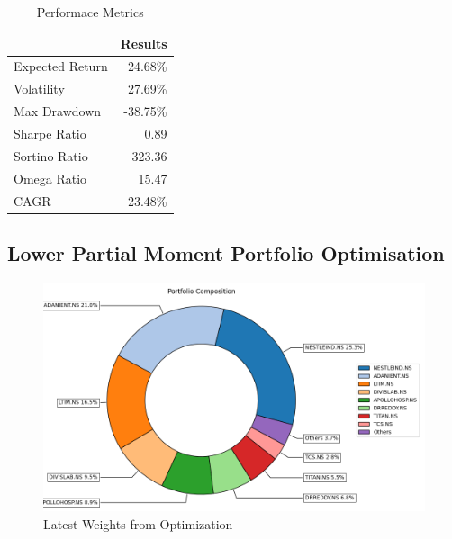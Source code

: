  \begin{table}[H]

    \centering %
    \label{tab:performance_metrics}
    
    \caption{Performace Metrics}
    \vspace{5mm} %

\begin{tabular}{lr}
\toprule
 & Results \\
\midrule
Expected Return & 24.68\% \\
Volatility & 27.69\% \\
Max Drawdown & -38.75\% \\
Sharpe Ratio & 0.89 \\
Sortino Ratio & 323.36 \\
Omega Ratio & 15.47 \\
CAGR & 23.48\% \\
\bottomrule
\end{tabular}
\end{table}

\subsection{Lower Partial Moment Portfolio Optimisation}

\begin{figure}[H]
   \centering
   \includegraphics[width=1\linewidth]{images/LPM/Weights.png}
   \caption{Latest Weights from Optimization}
   \label{fig:network_architecture1}
 \end{figure}

